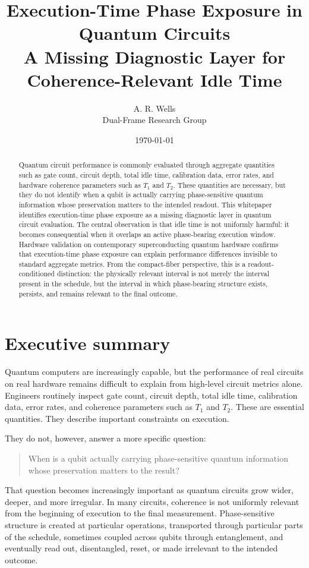 \documentclass[11pt]{article}
\title{\textbf{Execution-Time Phase Exposure in Quantum Circuits}\\
\large A Missing Diagnostic Layer for Coherence-Relevant Idle Time}
\author{A. R. Wells\\
Dual-Frame Research Group}
\date{\today}
\begin{document}
\maketitle

\begin{abstract}
Quantum circuit performance is commonly evaluated through aggregate quantities such as gate count, circuit depth, total idle time, calibration data, error rates, and hardware coherence parameters such as \(T_1\) and \(T_2\). These quantities are necessary, but they do not identify when a qubit is actually carrying phase-sensitive quantum information whose preservation matters to the intended readout. This whitepaper identifies execution-time phase exposure as a missing diagnostic layer in quantum circuit evaluation. The central observation is that idle time is not uniformly harmful: it becomes consequential when it overlaps an active phase-bearing execution window. Hardware validation on contemporary superconducting quantum hardware confirms that execution-time phase exposure can explain performance differences invisible to standard aggregate metrics. From the compact-fiber perspective, this is a readout-conditioned distinction: the physically relevant interval is not merely the interval present in the schedule, but the interval in which phase-bearing structure exists, persists, and remains relevant to the final outcome.
\end{abstract}

\section*{Executive summary}

Quantum computers are increasingly capable, but the performance of real circuits on real hardware remains difficult to explain from high-level circuit metrics alone. Engineers routinely inspect gate count, circuit depth, total idle time, calibration data, error rates, and coherence parameters such as \(T_1\) and \(T_2\). These are essential quantities. They describe important constraints on execution.

They do not, however, answer a more specific question:

\begin{quote}
When is a qubit actually carrying phase-sensitive quantum information whose preservation matters to the result?
\end{quote}

That question becomes increasingly important as quantum circuits grow wider, deeper, and more irregular. In many circuits, coherence is not uniformly relevant from the beginning of execution to the final measurement. Phase-sensitive structure is created at particular operations, transported through particular parts of the schedule, sometimes coupled across qubits through entanglement, and eventually read out, disentangled, reset, or made irrelevant to the intended outcome.
\end{document}
